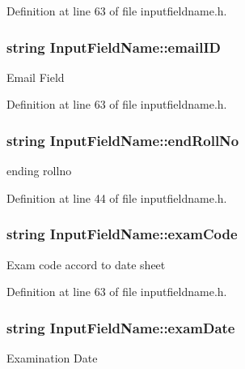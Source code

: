 \-Definition at line 63 of file inputfieldname.\-h.

\hypertarget{classInputFieldName_a05541618feaaebe7a3f74b0bf8fa74b9}{
\subsubsection[{email\-I\-D}]{\setlength{\rightskip}{0pt plus 5cm}string {\bf \-Input\-Field\-Name\-::email\-I\-D}}}\label{dd/db2/classInputFieldName_a05541618feaaebe7a3f74b0bf8fa74b9}
\-Email \-Field 

\-Definition at line 63 of file inputfieldname.\-h.

\hypertarget{classInputFieldName_a06435f9ba5a529cbba4ee1ce9b02e5cc}{
\subsubsection[{end\-Roll\-No}]{\setlength{\rightskip}{0pt plus 5cm}string {\bf \-Input\-Field\-Name\-::end\-Roll\-No}}}\label{dd/db2/classInputFieldName_a06435f9ba5a529cbba4ee1ce9b02e5cc}
ending rollno 

\-Definition at line 44 of file inputfieldname.\-h.

\hypertarget{classInputFieldName_a3cc09a852d20e96bb4908b9f66c01ed7}{
\subsubsection[{exam\-Code}]{\setlength{\rightskip}{0pt plus 5cm}string {\bf \-Input\-Field\-Name\-::exam\-Code}}}\label{dd/db2/classInputFieldName_a3cc09a852d20e96bb4908b9f66c01ed7}
\-Exam code accord to date sheet 

\-Definition at line 63 of file inputfieldname.\-h.

\hypertarget{classInputFieldName_a4e60d793497c36b2d80e2411cbb915d8}{
\subsubsection[{exam\-Date}]{\setlength{\rightskip}{0pt plus 5cm}string {\bf \-Input\-Field\-Name\-::exam\-Date}}}\label{dd/db2/classInputFieldName_a4e60d793497c36b2d80e2411cbb915d8}
\-Examination \-Date 

